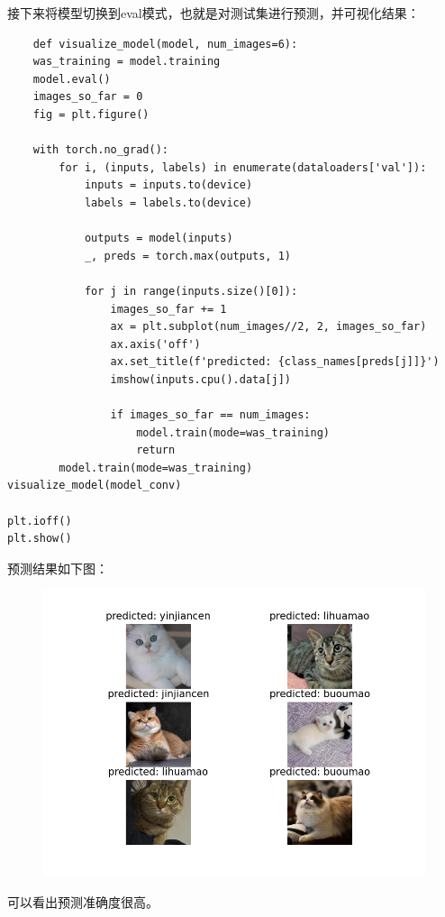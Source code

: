 \documentclass[12pt, a4paper, oneside]{ctexart} %
\begin{document}
接下来将模型切换到eval模式，也就是对测试集进行预测，并可视化结果：

\begin{lstlisting}
    def visualize_model(model, num_images=6):
    was_training = model.training
    model.eval()
    images_so_far = 0
    fig = plt.figure()

    with torch.no_grad():
        for i, (inputs, labels) in enumerate(dataloaders['val']):
            inputs = inputs.to(device)
            labels = labels.to(device)

            outputs = model(inputs)
            _, preds = torch.max(outputs, 1)

            for j in range(inputs.size()[0]):
                images_so_far += 1
                ax = plt.subplot(num_images//2, 2, images_so_far)
                ax.axis('off')
                ax.set_title(f'predicted: {class_names[preds[j]]}')
                imshow(inputs.cpu().data[j])

                if images_so_far == num_images:
                    model.train(mode=was_training)
                    return
        model.train(mode=was_training)
visualize_model(model_conv)

plt.ioff()
plt.show()
\end{lstlisting}

预测结果如下图：

\begin{figure}[H]
    \centering
    \includegraphics[width=1\textwidth]{3.png}
\end{figure}

可以看出预测准确度很高。
\end{document}
